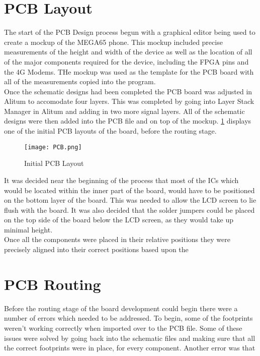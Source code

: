 \section{PCB Layout}

	The start of the PCB Design process begun with a graphical editor being used to create a mockup of the MEGA65 phone. This mockup included precise measurements of the height and width of the device as well as the location of all of the major components required for the device, including the FPGA pins and the 4G Modems. THe mockup was used as the template for the PCB board with all of the measurements copied into the program. \\
	Once the schematic designs had been completed the PCB board was adjusted in Alitum to accomodate four layers. This was completed by going into Layer Stack Manager in Alitum and adding in two more signal layers. All of the schematic designs were then added into the PCB file and on top of the mockup. \ref{fig:Initial_PCB} displays one of the initial PCB layouts of the board, before the routing stage.\\

\begin{figure}
	\texttt{[image: PCB.png]}
	\caption{Initial PCB Layout}
	\label{fig:Initial_PCB}
\end{figure}

	It was decided near the beginning of the process that most of the ICs which would be located within the inner part of the board, would have to be positioned on the bottom layer of the board. This was needed to allow the LCD screen to lie flush with the board. It was also decided that the solder jumpers could be placed on the top side of the board below the LCD screen, as they would take up minimal height.\\
	Once all the components were placed in their relative positions they were precisely aligned into their correct positions based upon the 
\section{PCB Routing}

	Before the routing stage of the board development could begin there were a number of errors which needed to be addressed. To begin, some of the footprints weren't working correctly when imported over to the PCB file. Some of these issues were solved by going back into the schematic files and making sure that all the correct footprints were in place, for every component. Another error was that 

